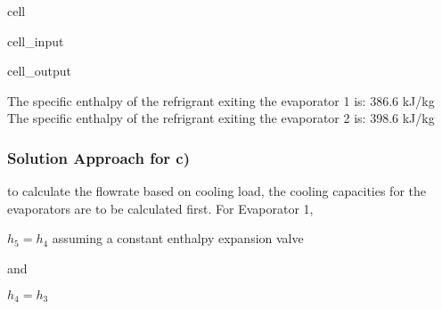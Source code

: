 \documentclass[letterpaper,10pt,english]{jupyterBook}
\begin{document}
\begin{sphinxuseclass}{cell}
\begin{sphinxVerbatimInput}
\begin{sphinxuseclass}{cell_input}
\begin{sphinxVerbatim}[commandchars=\\\{\}]
  
  
\end{sphinxVerbatim}

\end{sphinxuseclass}\end{sphinxVerbatimInput}
\begin{sphinxVerbatimOutput}

\begin{sphinxuseclass}{cell_output}
\begin{sphinxVerbatim}[commandchars=\\\{\}]
The specific enthalpy of the refrigrant exiting the evaporator 1 is: 386.6 kJ/kg
The specific enthalpy of the refrigrant exiting the evaporator 2 is: 398.6 kJ/kg
\end{sphinxVerbatim}

\end{sphinxuseclass}\end{sphinxVerbatimOutput}

\end{sphinxuseclass}

\subsubsection{Solution Approach for c)}
\label{\detokenize{notebooks/Chapter5/CH5-Q8:solution-approach-for-c}}
\sphinxAtStartPar
to calculate the flow\sphinxhyphen{}rate based on cooling load, the cooling capacities for the evaporators are to be calculated first. For Evaporator 1,

\sphinxAtStartPar
\(h_5=h_4\) assuming a constant enthalpy expansion valve

\sphinxAtStartPar
and

\sphinxAtStartPar
\(h_4=h_3\)
\end{document}
